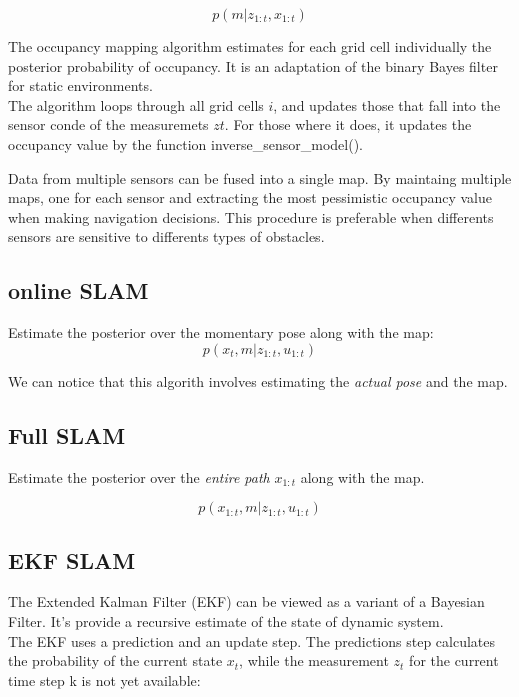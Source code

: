\documentclass[10pt,journal,compsoc]{IEEEtran}
\begin{document}
\begin{equation}
  p(m|z_{1:t},x_{1:t})
\end{equation}

The occupancy mapping algorithm estimates for each grid cell individually the posterior probability of occupancy. It is
an adaptation of the binary Bayes filter for static environments.\\
The algorithm loops through all grid cells $i$, and updates those that
fall into the sensor conde of the measuremets $zt$. For those where it does, it updates the occupancy value by the
function inverse\_sensor\_model().


Data from multiple sensors can be fused into a single map. By maintaing multiple maps, one for each sensor and
extracting the most pessimistic occupancy value when making navigation decisions. This procedure is preferable when
differents sensors are sensitive to differents types of obstacles.

\subsection{online SLAM}

Estimate the posterior over the momentary pose along with the map:
\begin{equation}
  p(x_t, m| z_{1:t},u_{1:t})
\end{equation}

We can notice that this algorith involves estimating the \textit{actual pose} and the map.
\subsection{Full SLAM}
Estimate the posterior over the \textit{entire path} $x_{1:t}$ along with the map.

\begin{equation}
  p(x_{1:t}, m| z_{1:t},u_{1:t})
\end{equation}

\subsection{EKF SLAM}

The Extended Kalman Filter (EKF) can be viewed as a variant of a Bayesian Filter. It's provide a recursive estimate of
the state of dynamic system.\\
The EKF uses a prediction and an update step. The predictions step calculates the probability of the current state
$x_t$, while the measurement $z_t$ for the current time step k is not yet available:
\end{document}

